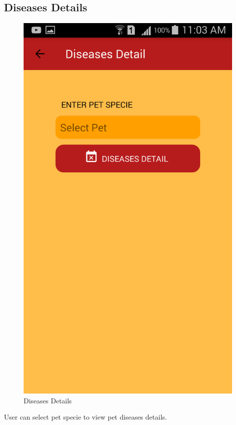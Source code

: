 \newpage
\subsection{Diseases Details}
\begin{figure}[H]
  \centering
    \includegraphics[scale=0.3]{87Diseases_Details}
     \caption{Diseases Details}
\end{figure}
User can select pet specie to view pet diseases details.

